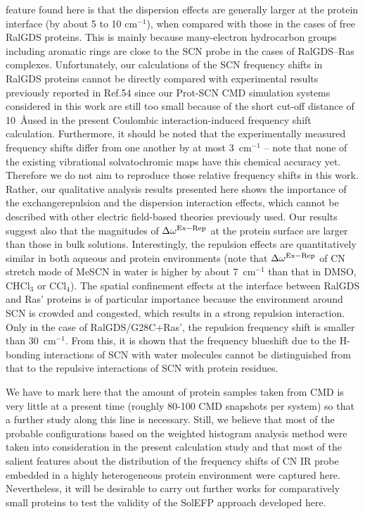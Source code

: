 \documentclass[a4paper,titlepage,twoside,fleqn,12pt]{book}
\begin{document}
\begin{refsection}
feature found here is that the dispersion effects are generally
larger at the protein interface (by about 5 to 10 cm$^{-1}$), when
compared with those in the cases of free RalGDS proteins. This
is mainly because many\hyp{}electron hydrocarbon groups including
aromatic rings are close to the SCN probe in the cases of
RalGDS--Ras complexes. Unfortunately, our calculations of the
SCN frequency shifts in RalGDS proteins cannot be directly
compared with experimental results previously reported in
Ref.54 since our Prot-SCN CMD simulation systems considered in
this work are still too small because of the short cut\hyp{}off
distance of 10~\AA used in the present Coulombic interaction\hyp{}induced
frequency shift calculation. Furthermore, it should be noted
that the experimentally measured frequency shifts differ from
one another by at most 3~cm$^{-1}$ -- note that none of the existing
vibrational solvatochromic maps have this chemical accuracy
yet. Therefore we do not aim to reproduce those relative
frequency shifts in this work. Rather, our qualitative analysis
results presented here shows the importance of the exchangerepulsion
and the dispersion interaction effects, which cannot
be described with other electric field\hyp{}based theories previously
used. Our results suggest also that the magnitudes of
$\Delta\omega^{\rm Ex-Rep}$ at the protein surface are larger than those in bulk
solutions. Interestingly, the repulsion effects are quantitatively
similar in both aqueous and protein environments (note that
$\Delta\omega^{\rm Ex-Rep}$ of CN stretch mode of MeSCN in water is higher by
about 7~cm$^{-1}$ than that in DMSO, CHCl$_3$ or CCl$_4$). The spatial
confinement effects at the interface between RalGDS and Ras'
proteins is of particular importance because the environment
around SCN is crowded and congested, which results in a
strong repulsion interaction. Only in the case of
RalGDS/G28C+Ras', the repulsion frequency shift is smaller
than 30~cm$^{-1}$. From this, it is shown that the frequency blueshift
due to the H-bonding interactions of SCN with water
molecules cannot be distinguished from that to the repulsive
interactions of SCN with protein residues.

We have to mark here that the amount of protein samples
taken from CMD is very little at a present time (roughly 80-100
CMD snapshots per system) so that a further study along this
line is necessary. Still, we believe that most of the probable
configurations based on the weighted histogram analysis
method were taken into consideration in the present
calculation study and that most of the salient features about
the distribution of the frequency shifts of CN IR probe
embedded in a highly heterogeneous protein environment
were captured here. Nevertheless, it will be desirable to carry
out further works for comparatively small proteins to test the
validity of the SolEFP approach developed here.




\end{refsection}
\end{document}
